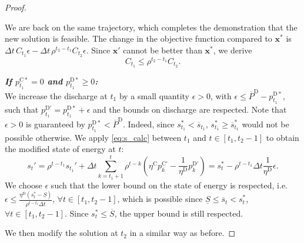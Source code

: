 \documentclass[10pt,a4paper]{amsart}
\newcommand{\up}[1]{^{\mathrm{#1}}}
\begin{document}
\begin{proof}
\begin{itemize}
\begin{equation}
        \end{equation}
        We are back on the same trajectory, which completes the demonstration that the new solution is feasible.
        The change in the objective function compared to $\mathbf{x}^*$ is $\Delta t \, C_{t_1} \epsilon - \Delta t \, \rho^{t_2 - t_1} C_{t_2} \epsilon$. Since $\mathbf{x}'$ cannot be better than $\mathbf{x}^*$, we derive
        \begin{equation} \label{eq:star_pc_pc}
            C_{t_1} \leq \rho^{t_2 - t_1} C_{t_2}.
        \end{equation}
    \end{itemize}

   \textit{\textbf{If $p\up{C*}_{t_1}=0$ and $p\up{D*}_{t_1}\geq0$:}} \\ 
   We increase the discharge at $t_1$ by a small quantity ${\epsilon} > 0$, with ${\epsilon} \leq \overline{P}\up{D} - {p}\up{D*}_{t_1}$, such that ${p}\up{D'}_{t_1}={p}\up{D*}_{t_1}+{\epsilon}$ and the bounds on discharge are respected. Note that ${\epsilon} >0$ is guaranteed by $p\up{D*}_{t_1} < \overline{P}\up{D}$. Indeed, since ${s}_{t_1}^* < \overline{s}_{t_1}$, ${s}_{t_1}^* \geq \overline{s}_{t_1}^*$ would not be possible otherwise.
    We apply \eqref{eq:s_calc} between $t_1$ and $t \in [t_1,t_2-1]$ to obtain the modified state of energy at $t$:
    \begin{equation}
        {s}_t' = \rho^{t - t_1} s_{t_1}' + \Delta t \sum_{k=t_1+1}^{t} \rho^{t - k} \left( \eta\up{C} p_k\up{C'} - \frac{1}{\eta\up{D}} p_k\up{D'} \right) = {s}_t^* - \rho^{t - t_1} \Delta t \frac{1}{\eta\up{D}} {\epsilon}.   
    \end{equation}
    We choose ${\epsilon}$ such that the lower bound on the state of energy is respected, i.e. ${\epsilon} \leq  \frac{\eta\up{D}({s}_t^* - \underline{S})}{\rho^{t - t_1} \Delta t}$, $\forall t \in [t_1,t_2-1]$, which is possible since $\underline{S} \leq \overline{s}_t < s_t^*$, $ \forall t \in [t_1,t_2-1]$. 
    Since ${s}_t^* \leq \overline{S}$, the upper bound is still respected.

    We then modify the solution at $t_2$ in a similar way as before.


\end{proof}
\end{document}
